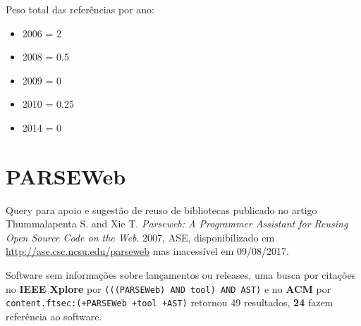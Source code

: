 Peso total das referências por ano:

\begin{itemize}
\item 2006 = 2
\item 2008 = 0.5
\item 2009 = 0
\item 2010 = 0.25
\item 2014 = 0
\end{itemize}


\section{PARSEWeb}

Query para apoio e sugestão de reuso de bibliotecas
publicado no artigo
Thummalapenta S. and Xie T.
{\it Parseweb: A Programmer Assistant for Reusing Open Source Code on the Web}.
2007,
ASE,
disponibilizado em \url{http://ase.csc.ncsu.edu/parseweb}
mas inacessível em 09/08/2017.

Software sem informações sobre lançamentos ou releases,
uma busca por citações no {\bf IEEE Xplore} por
\texttt{(((PARSEWeb) AND tool) AND AST)}
e no {\bf ACM} por
\texttt{content.ftsec:(+PARSEWeb +tool +AST)}
retornou
49 resultados,
{\bf 24} fazem referência ao software.

